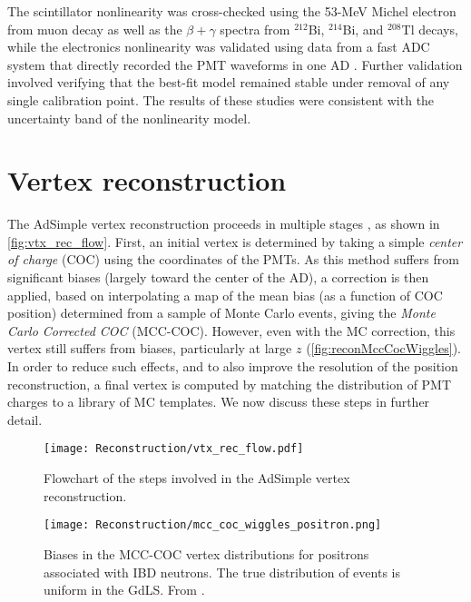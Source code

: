 \documentclass[../thesis.tex]{subfiles}
\begin{document}
The scintillator nonlinearity was cross-checked using the 53-MeV Michel electron from muon decay as well as the $\beta+\gamma$ spectra from $^{212}$Bi, $^{214}$Bi, and $^{208}$Tl decays, while the electronics nonlinearity was validated using data from a fast ADC system that directly recorded the PMT waveforms in one AD \cite{HUANG201848}. Further validation involved verifying that the best-fit model remained stable under removal of any single calibration point. The results of these studies were consistent with the uncertainty band of the nonlinearity model.

\section{Vertex reconstruction}
\label{sec:reconVertex}

The AdSimple vertex reconstruction proceeds in multiple stages \cite{adsimple1,adsimple2}, as shown in \autoref{fig:vtx_rec_flow}. First, an initial vertex is determined by taking a simple \emph{center of charge} (COC) using the coordinates of the PMTs. As this method suffers from significant biases (largely toward the center of the AD), a correction is then applied, based on interpolating a map of the mean bias (as a function of COC position) determined from a sample of Monte Carlo events, giving the \emph{Monte Carlo Corrected COC} (MCC-COC). However, even with the MC correction, this vertex still suffers from biases, particularly at large $z$ (\autoref{fig:reconMccCocWiggles}). In order to reduce such effects, and to also improve the resolution of the position reconstruction, a final vertex is computed by matching the distribution of PMT charges to a library of MC templates. We now discuss these steps in further detail. 

\begin{figure}[h]
  \texttt{[image: Reconstruction/vtx\_rec\_flow.pdf]}
  \caption{Flowchart of the steps involved in the AdSimple vertex reconstruction.}
  \label{fig:vtx_rec_flow}
\end{figure}


\begin{figure}[h]
  \texttt{[image: Reconstruction/mcc\_coc\_wiggles\_positron.png]}
  \caption{Biases in the MCC-COC vertex distributions for positrons associated with IBD neutrons. The true distribution of events is uniform in the GdLS. From \cite{adsimple1}.}
  \label{fig:reconMccCocWiggles}
\end{figure}
\end{document}

